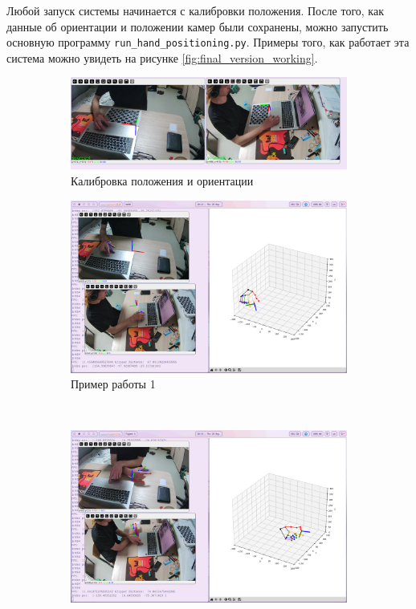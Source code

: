 \documentclass[14pt, a4paper]{extarticle}
\begin{document}
Любой запуск системы начинается с калибровки положения. После того, как данные
об ориентации и положении камер были сохранены, можно запустить основную
программу \texttt{run\_hand\_positioning.py}. Примеры того, как работает эта
система можно увидеть на рисунке \ref{fig:final_version_working}.
\begin{figure}[!ht]
\centering
    \begin{subfigure}{0.45\textwidth}
      \centering
      \includegraphics[width=\linewidth]{images/final_version_working/orientation_calibration.png}
      \caption{Калибровка положения и ориентации}
    \end{subfigure}
    \hfill
    \begin{subfigure}{0.45\textwidth}
      \centering
      \includegraphics[width=\linewidth]{images/final_version_working/pose-1.png}
      \caption{Пример работы 1}
    \end{subfigure}
    \\
    \begin{subfigure}{0.45\textwidth}
      \centering
      \includegraphics[width=\linewidth]{images/final_version_working/pose-2.png}

\end{subfigure}
\end{figure}
\end{document}
